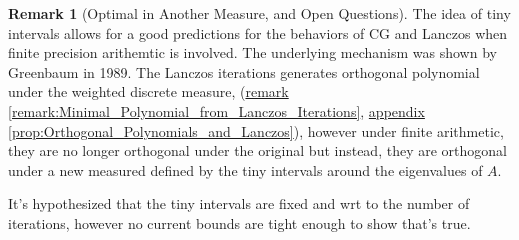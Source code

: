 \documentclass[]{article}
\theoremstyle{definition}
\newtheorem{remark}{Remark}[subsection]  %
\begin{document}
        \begin{remark}[Optimal in Another Measure, and Open Questions]
            The idea of tiny intervals allows for a good predictions for the behaviors of CG and Lanczos when finite precision arithemtic is involved. The underlying mechanism was shown by Greenbaum in 1989\cite{paper:greenbaum_tiny_interval_experiments}. The Lanczos iterations generates orthogonal polynomial under the weighted discrete measure, (\hyperref[remark:Minimal_Polynomial_from_Lanczos_Iterations]{remark \ref*{remark:Minimal_Polynomial_from_Lanczos_Iterations}}, \hyperref[prop:Orthogonal_Polynomials_and_Lanczos]{appendix \ref*{prop:Orthogonal_Polynomials_and_Lanczos}}), however under finite arithmetic, they are no longer orthogonal under the original but instead, they are orthogonal under a new measured defined by the tiny intervals around the eigenvalues of $A$. 
            \par
            It's hypothesized that the tiny intervals are fixed and wrt to the number of iterations, however no current bounds are tight enough to show that's true. 
        \end{remark}
    
\end{document}
